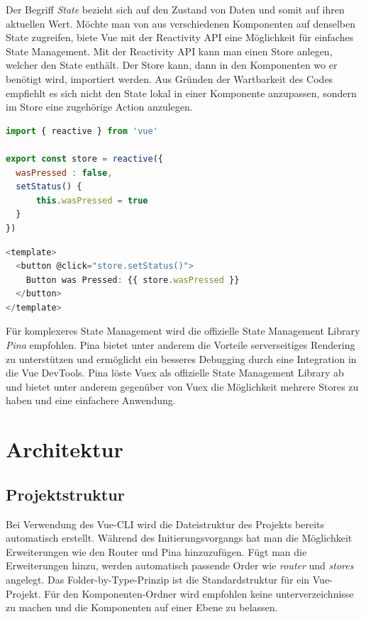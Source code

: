 Der Begriff \emph{State} bezieht sich auf den Zustand von Daten und somit auf ihren aktuellen Wert.
Möchte man von aus verschiedenen Komponenten auf denselben State zugreifen,
biete Vue mit der Reactivity API eine Möglichkeit für einfaches State Management.
Mit der Reactivity API kann man einen Store anlegen, welcher den State enthält.
Der Store kann, dann in den Komponenten wo er benötigt wird, importiert werden.
Aus Gründen der Wartbarkeit des Codes empfiehlt es sich nicht den State lokal in einer Komponente anzupassen,
sondern im Store eine zugehörige Action anzulegen. \cite{vueStateManagement}

\begin{lstlisting}[caption={Anlegen eines Stores mit Reactivity API},language=javascript,label={lst:Anlegen-Store}]
import { reactive } from 'vue'

export const store = reactive({
  wasPressed : false,
  setStatus() {
      this.wasPressed = true
  }
})
\end{lstlisting}

\begin{lstlisting}[caption={Vewendung des Stores},language=javascript,label={lst:Verwendung-Store}]
<template>
  <button @click="store.setStatus()">
    Button was Pressed: {{ store.wasPressed }}
  </button>
</template>
\end{lstlisting}

Für komplexeres State Management wird die offizielle State Management Library \emph{Pina} empfohlen.
Pina bietet unter anderem die Vorteile serverseitiges Rendering zu unterstützen und
ermöglicht ein besseres Debugging durch eine Integration in die Vue DevTools.
Pina löste Vuex als offizielle State Management Library ab und bietet unter anderem gegenüber von Vuex
die Möglichkeit mehrere Stores zu haben und eine einfachere Anwendung.  \cite{vueStateManagement}

\section{Architektur}

\subsection*{Projektstruktur}
Bei Verwendung des Vue-CLI wird die Dateistruktur des Projekts bereits automatisch erstellt.
Während des Initierungsvorgangs hat man die Möglichkeit Erweiterungen wie den Router und Pina hinzuzufügen.
Fügt man die Erweiterungen hinzu, werden automatisch passende Order wie \emph{router} und \emph{stores} angelegt.
Das Folder-by-Type-Prinzip ist die Standardstruktur für ein Vue-Projekt.
Für den Komponenten-Ordner wird empfohlen keine unterverzeichnisse zu machen und
die Komponenten auf einer Ebene zu belassen. \cite{largeScaleVue}

